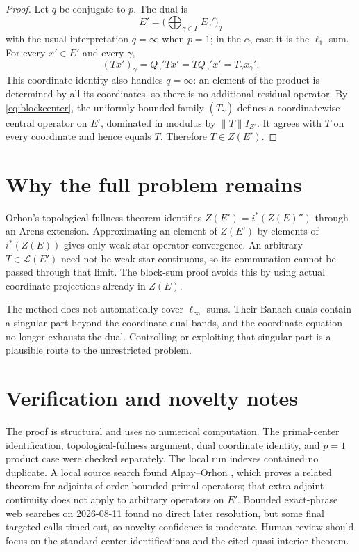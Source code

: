 \documentclass[11pt]{amsart}
\newcommand{\cL}{\mathcal L}
\begin{document}
\begin{proof}
Let $q$ be conjugate to $p$.  The dual is
\[
 E'=\Big(\bigoplus_{\gamma\in\Gamma}E_\gamma'\Big)_q
\]
with the usual interpretation $q=\infty$ when $p=1$; in the $c_0$ case it is
the $\ell_1$-sum.  For every $x'\in E'$ and every $\gamma$,
\[
 (Tx')_\gamma=Q_\gamma'Tx'=TQ_\gamma'x'=T_\gamma x_\gamma'.
\]
This coordinate identity also handles $q=\infty$: an element of the product
is determined by all its coordinates, so there is no additional residual
operator.  By \eqref{eq:blockcenter}, the uniformly bounded family
$(T_\gamma)$ defines a coordinatewise central operator on $E'$, dominated in
modulus by $\|T\|I_{E'}$.  It agrees with $T$ on every coordinate and hence
equals $T$.  Therefore $T\in Z(E')$.
\end{proof}

\section*{Why the full problem remains}

Orhon's topological-fullness theorem identifies
$Z(E')=i^*(Z(E)'')$ through an Arens extension.  Approximating an element of
$Z(E')$ by elements of $i^*(Z(E))$ gives only weak-star operator convergence.
An arbitrary $T\in\cL(E')$ need not be weak-star continuous, so its
commutation cannot be passed through that limit.  The block-sum proof avoids
this by using actual coordinate projections already in $Z(E)$.

The method does not automatically cover $\ell_\infty$-sums.  Their Banach
duals contain a singular part beyond the coordinate dual bands, and the
coordinate equation no longer exhausts the dual.  Controlling or exploiting
that singular part is a plausible route to the unrestricted problem.

\section*{Verification and novelty notes}

The proof is structural and uses no numerical computation.  The primal-center
identification, topological-fullness argument, dual coordinate identity, and
$p=1$ product case were checked separately.  The local run indexes contained
no duplicate.  A local source search found Alpay--Orhon \cite{AlpayOrhon2014},
which proves a related theorem for adjoints of order-bounded primal operators;
that extra adjoint continuity does not apply to arbitrary operators on $E'$.
Bounded exact-phrase web searches on 2026-08-11 found no direct later
resolution, but some final targeted calls timed out, so novelty confidence is
moderate.  Human review should focus on the standard center identifications
and the cited quasi-interior theorem.
\end{document}
